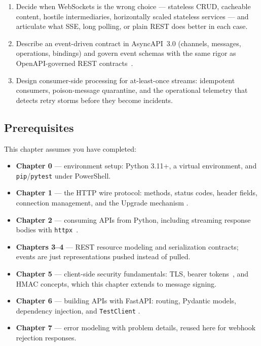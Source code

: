 \begin{enumerate}[label=\textbf{LO-\arabic*.}, leftmargin=2.6cm]
        ping/pong and close codes correctly.
  \item Decide when WebSockets is the wrong choice --- stateless CRUD,
        cacheable content, hostile intermediaries, horizontally scaled
        stateless services --- and articulate what SSE, long polling, or plain
        REST does better in each case.
  \item Describe an event-driven contract in AsyncAPI~3.0 (channels,
        messages, operations, bindings) and govern event schemas with the
        same rigor as OpenAPI-governed REST contracts~\cite{asyncapi}.
  \item Design consumer-side processing for at-least-once streams:
        idempotent consumers, poison-message quarantine, and the operational
        telemetry that detects retry storms before they become incidents.
\end{enumerate}

\subsection*{Prerequisites}
This chapter assumes you have completed:

\begin{itemize}
  \item \textbf{Chapter 0} --- environment setup: Python 3.11+, a virtual
        environment, and \texttt{pip}/\texttt{pytest} under PowerShell.
  \item \textbf{Chapter 1} --- the HTTP wire protocol: methods, status codes,
        header fields, connection management, and the Upgrade mechanism
        \cite{rfc9110}.
  \item \textbf{Chapter 2} --- consuming APIs from Python, including
        streaming response bodies with \texttt{httpx}~\cite{httpxdocs}.
  \item \textbf{Chapters 3--4} --- REST resource modeling and serialization
        contracts; events are just representations pushed instead of pulled.
  \item \textbf{Chapter 5} --- client-side security fundamentals: TLS,
        bearer tokens~\cite{rfc6749}, and HMAC concepts, which this chapter
        extends to message signing.
  \item \textbf{Chapter 6} --- building APIs with FastAPI: routing, Pydantic
        models, dependency injection, and \texttt{TestClient}
        \cite{fastapidocs}.
  \item \textbf{Chapter 7} --- error modeling with problem details, reused
        here for webhook rejection responses.
\end{itemize}

